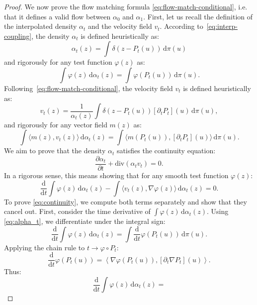 \begin{proof} We now prove the flow matching formula \eqref{eq:flow-match-conditional}, i.e. that it defines a valid flow between $\alpha_0$ and $\alpha_1$. 
%
First, let us recall the definition of the interpolated density \(\alpha_t\) and the velocity field \(v_t\). 
According to~\eqref{eq:interp-coupling}, the density \(\alpha_t\) is defined heuristically as:
\[
	\alpha_t(z) = \int \delta(z - P_t(u)) \, \mathrm{d}\pi(u)
\]
and rigorously for any test function \(\varphi(z)\) as:
\begin{equation}
	\int \varphi(z) \, \mathrm{d}\alpha_t(z) = \int \varphi(P_t(u)) \, \mathrm{d} \pi(u). \label{eq:alpha_t}
\end{equation}
Following~\eqref{eq:flow-match-conditional}, the velocity field \(v_t\) is defined heuristically as:
\[
	v_t(z) = \frac{1}{\alpha_t(z)} \int \delta(z - P_t(u)) [\partial_t P_t](u) \, \mathrm{d}\pi(u),
\]
and rigorously for any vector field \(m(z)\) as:
\begin{equation}
	\int \langle m(z), v_t(z) \rangle \, \mathrm{d}\alpha_t(z) = \int \langle m(P_t(u)), [\partial_t  P_t](u) \rangle \, \mathrm{d}\pi(u). \label{eq:v_t}
\end{equation}
We aim to prove that the density \(\alpha_t\) satisfies the continuity equation:
\[
	\frac{\partial \alpha_t}{\partial t} + \mathrm{div}(\alpha_t v_t) = 0.
\]
In a rigorous sense, this means showing that for any smooth test function \(\varphi(z)\):
\begin{equation}
	\frac{\mathrm{d}}{\mathrm{d}t} \int \varphi(z) \, \mathrm{d}\alpha_t(z) - \int \langle v_t(z), \nabla \varphi(z) \rangle \, \mathrm{d}\alpha_t(z) = 0. \label{eq:continuity}
\end{equation}
To prove \eqref{eq:continuity}, we compute both terms separately and show that they cancel out. First, consider the time derivative of \(\int \varphi(z) \, \mathrm{d}\alpha_t(z)\). Using \eqref{eq:alpha_t}, we differentiate under the integral sign:
\[
	\frac{\mathrm{d}}{\mathrm{d}t} \int \varphi(z) \, \mathrm{d}\alpha_t(z) = \int \frac{\mathrm{d}}{\mathrm{d}t} \varphi(P_t(u)) \, \mathrm{d}\pi(u).
\]
Applying the chain rule to \(t \to \varphi \circ P_t\):
\[
	\frac{\mathrm{d}}{\mathrm{d}t} \varphi(P_t(u)) = \left\langle \nabla  \varphi(P_t(u)), [\partial_t \nabla P_t](u) \right\rangle.
\]
Thus:
\begin{equation}
	\frac{\mathrm{d}}{\mathrm{d}t} \int \varphi(z) \, \mathrm{d}\alpha_t(z) = 

\end{equation}
\end{proof}
